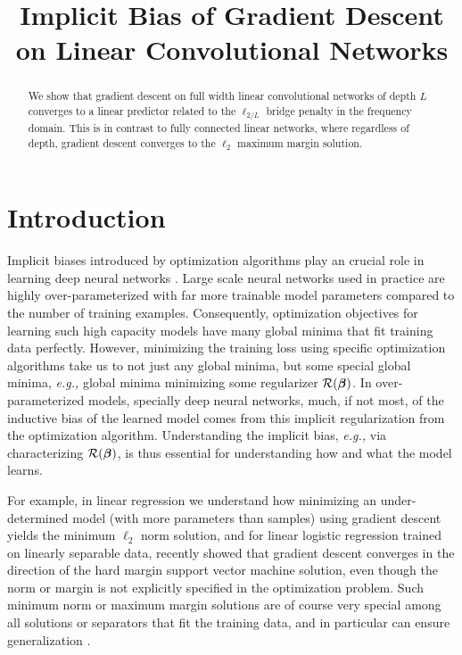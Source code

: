 \documentclass{article}
\title{Implicit Bias of Gradient Descent on Linear Convolutional Networks}
\renewcommand{\c}{\mathcal}
\newcommand{\eg}{\textit{e.g.,} }
\newcommand{\w}[1][]{\ifthenelse{\equal{#1}{}}{\boldsymbol{\beta}}{\boldsymbol{\beta}^{(#1)}}}
\begin{document}
\maketitle
\begin{abstract}
We show that gradient descent on full width linear convolutional networks of depth $L$ converges to a linear predictor related to the $\ell_{2/L}$ bridge penalty in the frequency domain.  This is in contrast to  fully connected linear networks, where regardless of depth, gradient descent converges to the $\ell_2$ maximum margin solution. %
\end{abstract}
\section{Introduction}
Implicit biases introduced by optimization algorithms  play an crucial role in learning deep neural networks \citep{neyshabur2015search,neyshabur2015path,hochreiter1997flat, keskar2016large, chaudhari2016entropy, dinh2017sharp,andrychowicz2016learning, neyshabur2017geometry,zhang2017understanding,wilson2017marginal,hoffer2017train,Smith2018}. Large scale neural networks used in practice are highly over-parameterized with far more trainable model parameters compared to the number of training examples. Consequently, optimization objectives for learning such high capacity models have many global minima that fit training data perfectly.
However,  minimizing the training loss using specific optimization algorithms take us to not just any global minima, but some special global minima, \eg global minima minimizing some regularizer $\c{R}(\w)$. In over-parameterized models, specially deep neural networks, much, if not most, of the inductive bias of the learned model comes from this implicit regularization from the optimization algorithm. Understanding the implicit bias, \eg via characterizing $\c{R}(\w)$, is thus essential for understanding how and what the model learns.

For example, in linear regression we understand how minimizing an under-determined model (with more parameters than samples) using gradient descent yields the minimum $\ell_2$ norm solution, and for linear logistic regression trained on linearly separable data, \citet{soudry2017implicit} recently showed that gradient descent converges in the direction of the hard margin support vector machine solution,  even though the norm or margin is not explicitly specified in the optimization problem.  Such minimum norm or maximum margin solutions are of course very special among all solutions or separators that fit the training data,  and in particular can ensure generalization \cite{bartlett2003rademacher,kakade2009complexity}.  
\end{document}
